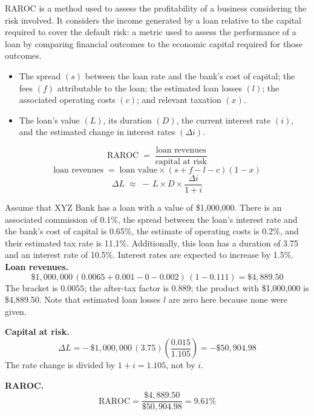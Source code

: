 
RAROC is a method used to assess the profitability of a business considering the
risk involved. It considers the income generated by a loan relative to the capital
required to cover the default risk: a metric used to assess the performance of a
loan by comparing financial outcomes to the economic capital required for those
outcomes.

\begin{itemize}
\item {} The spread $(s)$ between the loan rate and the
bank's cost of capital; the fees $(f)$ attributable to the loan; the estimated
loan losses $(l)$; the associated operating costs $(c)$; and relevant taxation
$(x)$.
\item {} The loan's value $(L)$, its duration $(D)$, the
current interest rate $(i)$, and the estimated change in interest rates
$(\Delta i)$.
\end{itemize}

\begin{crfmlbox}[RAROC]
\[ \mathrm{RAROC} \;=\; \frac{\text{loan revenues}}{\text{capital at risk}} \]
\[ \text{loan revenues} \;=\; \text{loan value} \times (s + f - l - c)(1-x) \]
\[ \Delta L \;\approx\; -\,L \times D \times \frac{\Delta i}{1+i} \]
\end{crfmlbox}

\begin{crexbox}
Assume that XYZ Bank has a loan with a value of \$1,000,000. There is an
associated commission of 0.1\%, the spread between the loan's interest rate and
the bank's cost of capital is 0.65\%, the estimate of operating costs is 0.2\%,
and their estimated tax rate is 11.1\%. Additionally, this loan has a duration of
3.75 and an interest rate of 10.5\%. Interest rates are expected to increase by
1.5\%.
\tcblower
\textbf{Loan revenues.}
\[ \$1{,}000{,}000\,(0.0065 + 0.001 - 0 - 0.002)\,(1 - 0.111) = \$4{,}889.50 \]
The bracket is $0.0055$; the after-tax factor is $0.889$; the product with
\$1,000,000 is \$4,889.50. Note that estimated loan losses $l$ are zero here
because none were given.

\textbf{Capital at risk.}
\[ \Delta L = -\,\$1{,}000{,}000\,(3.75)\left(\frac{0.015}{1.105}\right) = -\$50{,}904.98 \]
The rate change is divided by $1+i = 1.105$, not by $i$.

\textbf{RAROC.}
\[ \mathrm{RAROC} = \frac{\$4{,}889.50}{\$50{,}904.98} = 9.61\% \]
\end{crexbox}

